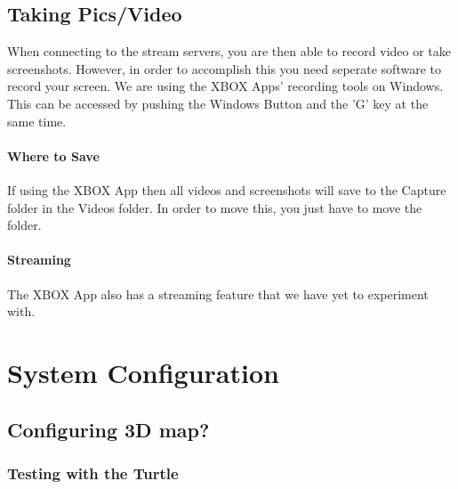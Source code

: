 \documentclass[
18pt, %
a4paper, %
oneside, %
headinclude,footinclude, %
]{scrartcl}
\begin{document}


\subsection{Taking Pics/Video}
When connecting to the stream servers, you are then able to record video or take screenshots. However, in order to accomplish this you need seperate software to record your screen. We are using the XBOX Apps' recording tools on Windows. This can be accessed by pushing the Windows Button and the 'G' key at the same time.

\paragraph{Where to Save} 
If using the XBOX App then all videos and screenshots will save to the Capture folder in the Videos folder. In order to move this, you just have to move the folder.

\paragraph{Streaming} 
The XBOX App also has a streaming feature that we have yet to experiment with.



\section{System Configuration}




\subsection{Configuring 3D map?}


\subsubsection{Testing with the Turtle}
\end{document}
